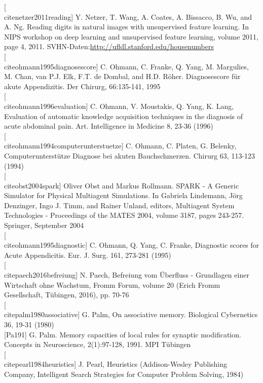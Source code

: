 \documentclass[10pt]{book}
\begin{document}
[\\cite{netzer2011reading}] Y. Netzer, T. Wang, A. Coates, A. Bissacco, B. Wu, and A. Ng. Reading digits in natural images with unsupervised feature learning. In NIPS workshop on deep learning and unsupervised feature learning, volume 2011, page 4, 2011. SVHN-Daten:\href{http://ufldl.stanford.edu/housenumbers}{http://ufldl.stanford.edu/housenumbers}\\[0pt]
[\\cite{ohmann1995diagnosescore}] C. Ohmann, C. Franke, Q. Yang, M. Margulies, M. Chan, van P.J. Elk, F.T. de Dombal, and H.D. Röher. Diagnosescore für akute Appendizitis. Der Chirurg, 66:135-141, 1995\\[0pt]
[\\cite{ohmann1996evaluation}] C. Ohmann, V. Moustakis, Q. Yang, K. Lang, Evaluation of automatic knowledge acquisition techniques in the diagnosis of acute abdominal pain. Art. Intelligence in Medicine 8, 23-36 (1996)\\[0pt]
[\\cite{ohmann1994computerunterstuetze}] C. Ohmann, C. Platen, G. Belenky, Computerunterstütze Diagnose bei akuten Bauchschmerzen. Chirurg 63, 113-123 (1994)\\[0pt]
[\\cite{obst2004spark}] Oliver Obst and Markus Rollmann. SPARK - A Generic Simulator for Physical Multiagent Simulations. In Gabriela Lindemann, Jörg Denzinger, Ingo J. Timm, and Rainer Unland, editors, Multiagent System Technologies - Proceedings of the MATES 2004, volume 3187, pages 243-257. Springer, September 2004\\[0pt]
[\\cite{ohmann1995diagnostic}] C. Ohmann, Q. Yang, C. Franke, Diagnostic scores for Acute Appendicitis. Eur. J. Surg. 161, 273-281 (1995)\\[0pt]
[\\cite{paech2016befreiung}] N. Paech, Befreiung vom Überfluss - Grundlagen einer Wirtschaft ohne Wachstum, Fromm Forum, volume 20 (Erich Fromm Gesellschaft, Tübingen, 2016), pp. 70-76\\[0pt]
[\\cite{palm1980associative}] G. Palm, On associative memory. Biological Cybernetics 36, 19-31 (1980)\\[0pt]
[Pa191] G. Palm. Memory capacities of local rules for synaptic modification. Concepts in Neuroscience, 2(1):97-128, 1991. MPI Tübingen\\[0pt]
[\\cite{pearl1984heuristics}] J. Pearl, Heuristics (Addison-Wesley Publishing Company, Intelligent Search Strategies for Computer Problem Solving, 1984)\\[0pt]
\end{document}
